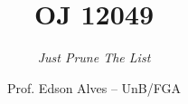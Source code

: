 \title{OJ 12049}
\subtitle{\textit{Just Prune The List}}
\author{Prof. Edson Alves -- UnB/FGA}
\date{}
